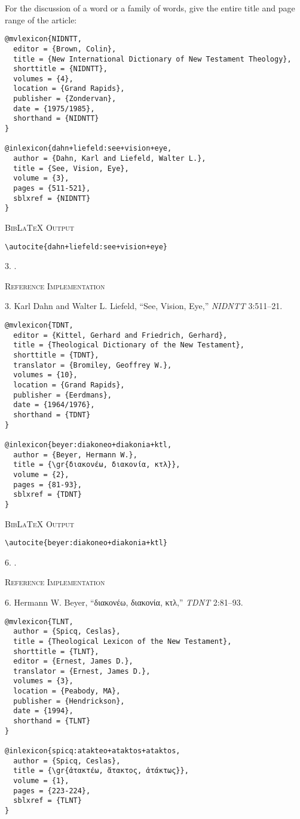 \documentclass[a4paper]{article}
\newcommand{\gr}[1]{{\greekfont #1}}
\newcommand\citetestlex[2]{%
  {\textsc{BibLaTeX Output}\par
   \nobreak
   \texttt{\textbackslash autocite\{#2\}}\par
   \color{biblatex-colour}
   #1. \cite{#2}.\par}}
\newenvironment{refimp}{%
  \begin{minipage}{\linewidth}
    \setlength{\parskip}{1ex}
    \textsc{Reference Implementation}\par
    \nobreak
    \color{reference-colour}
}{\end{minipage}}
\begin{document}
For the discussion of a word or a family of words, give the entire title and
page range of the article:

\begin{lstlisting}
@mvlexicon{NIDNTT,
  editor = {Brown, Colin},
  title = {New International Dictionary of New Testament Theology},
  shorttitle = {NIDNTT},
  volumes = {4},
  location = {Grand Rapids},
  publisher = {Zondervan},
  date = {1975/1985},
  shorthand = {NIDNTT}
}

@inlexicon{dahn+liefeld:see+vision+eye,
  author = {Dahn, Karl and Liefeld, Walter L.},
  title = {See, Vision, Eye},
  volume = {3},
  pages = {511-521},
  sblxref = {NIDNTT}
}
\end{lstlisting}

\citetestlex{3}{dahn+liefeld:see+vision+eye}

\begin{refimp}
  3. Karl Dahn and Walter L. Liefeld, “See, Vision, Eye,” \emph{NIDNTT} 3:511–21.
\end{refimp}

\begin{lstlisting}
@mvlexicon{TDNT,
  editor = {Kittel, Gerhard and Friedrich, Gerhard},
  title = {Theological Dictionary of the New Testament},
  shorttitle = {TDNT},
  translator = {Bromiley, Geoffrey W.},
  volumes = {10},
  location = {Grand Rapids},
  publisher = {Eerdmans},
  date = {1964/1976},
  shorthand = {TDNT}
}

@inlexicon{beyer:diakoneo+diakonia+ktl,
  author = {Beyer, Hermann W.},
  title = {\gr{διακονέω, διακονία, κτλ}},
  volume = {2},
  pages = {81-93},
  sblxref = {TDNT}
}
\end{lstlisting}
  
\citetestlex{6}{beyer:diakoneo+diakonia+ktl}

\begin{refimp}
  6. Hermann W. Beyer, “\gr{διακονέω, διακονία, κτλ},” \emph{TDNT} 2:81–93.
\end{refimp}

\begin{lstlisting}
@mvlexicon{TLNT,
  author = {Spicq, Ceslas},
  title = {Theological Lexicon of the New Testament},
  shorttitle = {TLNT},
  editor = {Ernest, James D.},
  translator = {Ernest, James D.},
  volumes = {3},
  location = {Peabody, MA},
  publisher = {Hendrickson},
  date = {1994},
  shorthand = {TLNT}
}

@inlexicon{spicq:atakteo+ataktos+ataktos,
  author = {Spicq, Ceslas},
  title = {\gr{ἀτακτέω, ἄτακτος, ἀτάκτως}},
  volume = {1},
  pages = {223-224},
  sblxref = {TLNT}
}
\end{lstlisting}
\end{document}
